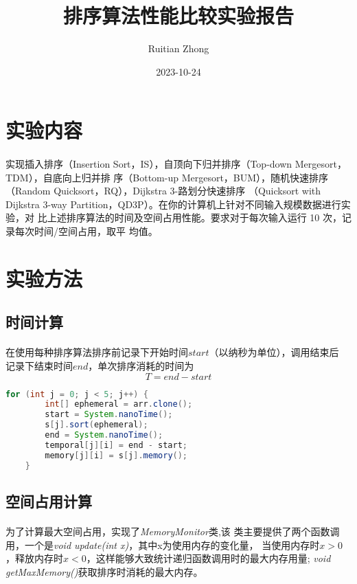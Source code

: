 \documentclass[12pt,a4paper]{ctexart}
\title{排序算法性能比较实验报告}
\author{Ruitian Zhong}
\date{2023-10-24}
\begin{document}
\maketitle
\section{实验内容}
\paragraph{}实现插入排序（Insertion Sort，IS），自顶向下归并排序（Top-down Mergesort，TDM），自底向上归并排
序（Bottom-up Mergesort，BUM），随机快速排序（Random Quicksort，RQ），Dijkstra 3-路划分快速排序
（Quicksort with Dijkstra 3-way Partition，QD3P）。在你的计算机上针对不同输入规模数据进行实验，对
比上述排序算法的时间及空间占用性能。要求对于每次输入运行 10 次，记录每次时间/空间占用，取平
均值。

\section{实验方法}
\subsection{时间计算}
\paragraph{}在使用每种排序算法排序前记录下开始时间$start$（以纳秒为单位），调用结束后
记录下结束时间$end$，单次排序消耗的时间为
$$ T = end - start $$

\begin{lstlisting}[basicstyle=\ttfamily,caption=sort/test.java,language=java,showstringspaces=false,firstnumber=140]
    for (int j = 0; j < 5; j++) {
        int[] ephemeral = arr.clone();
        start = System.nanoTime();
        s[j].sort(ephemeral);
        end = System.nanoTime();
        temporal[j][i] = end - start;
        memory[j][i] = s[j].memory();
    }
\end{lstlisting}



\subsection{空间占用计算}
\paragraph{}为了计算最大空间占用，实现了\textit{MemoryMonitor}类,该
类主要提供了两个函数调用，一个是\textit{void update(int x)}，其中x为使用内存的变化量，
当使用内存时$x>0$，释放内存时$x<0$，这样能够大致统计递归函数调用时的最大内存用量;
\textit{void getMaxMemory()}获取排序时消耗的最大内存。

\end{document}

